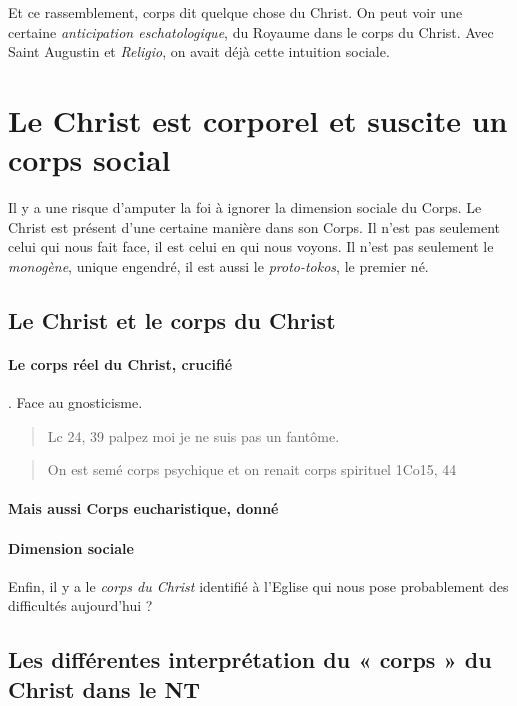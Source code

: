 Et ce rassemblement, corps dit quelque chose du Christ.
On peut voir une certaine \textit{anticipation eschatologique}, du Royaume dans le corps du Christ. Avec Saint Augustin et \textit{Religio}, on avait déjà cette intuition sociale.

\section{Le Christ est corporel et suscite un corps social }


 Il y a une risque d'amputer la foi à ignorer la dimension sociale du Corps. Le Christ est présent d'une certaine manière dans son Corps. Il n'est pas seulement celui qui nous fait face, il est celui en qui nous voyons. Il n'est pas seulement le \textit{monogène}, unique engendré, il est aussi le \textit{proto-tokos}, le premier né.
 
\subsection{Le Christ et le corps du Christ }
 
\paragraph{Le corps réel du Christ, crucifié}. Face au gnosticisme.
 
 \begin{quote}
     Lc 24, 39 palpez moi je ne suis pas un fantôme. 
 \end{quote}
\begin{quote}
    On est semé corps psychique et on renait corps spirituel 1Co15, 44
\end{quote}

\paragraph{Mais aussi Corps eucharistique, donné}

 
 \paragraph{Dimension sociale}Enfin, il y a le \textit{corps du Christ} identifié à l'Eglise qui nous pose probablement des difficultés aujourd'hui ?
 
 
 
 \subsection{Les différentes interprétation du « corps » du Christ dans le NT}
 
